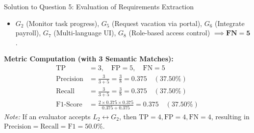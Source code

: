 \documentclass[11pt,a4paper]{article}
\begin{document}
\begin{solutionbox}{Solution to Question 5: Evaluation of Requirements Extraction}
\begin{itemize}[leftmargin=1.5em]
    \begin{itemize}
        \item $G_2$ (Monitor task progress), $G_5$ (Request vacation via portal), $G_6$ (Integrate payroll), $G_7$ (Multi-language UI), $G_8$ (Role-based access control) $\implies \mathbf{FN = 5}$.
    \end{itemize}
\end{itemize}
\textbf{Metric Computation (with 3 Semantic Matches):}
\begin{align}
    \text{TP} &= 3, \quad \text{FP} = 5, \quad \text{FN} = 5 \\
    \text{Precision} &= \frac{3}{3 + 5} = \frac{3}{8} = \mathbf{0.375} \quad (\mathbf{37.50\%}) \\
    \text{Recall} &= \frac{3}{3 + 5} = \frac{3}{8} = \mathbf{0.375} \quad (\mathbf{37.50\%}) \\
    \text{F1-Score} &= \frac{2 \times 0.375 \times 0.375}{0.375 + 0.375} = \mathbf{0.375} \quad (\mathbf{37.50\%})
\end{align}
\textit{Note:} If an evaluator accepts $L_2 \longleftrightarrow G_2$, then $\text{TP} = 4, \text{FP} = 4, \text{FN} = 4$, resulting in $\text{Precision} = \text{Recall} = \text{F1} = 50.0\%$.
\end{solutionbox}

\newpage
\end{document}
